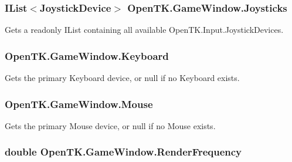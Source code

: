 \hypertarget{class_open_t_k_1_1_game_window_a97fe86dfe28cd8c059e53dc22a20458a}{
\subsubsection[{Joysticks}]{\setlength{\rightskip}{0pt plus 5cm}I\-List$<${\bf Joystick\-Device}$>$ Open\-T\-K.\-Game\-Window.\-Joysticks\hspace{0.3cm}{\ttfamily [get]}}}\label{class_open_t_k_1_1_game_window_a97fe86dfe28cd8c059e53dc22a20458a}


Gets a readonly I\-List containing all available Open\-T\-K.\-Input.\-Joystick\-Devices. 

\hypertarget{class_open_t_k_1_1_game_window_a1d5ef67f9be67c7355cacbde9872e09e}{
\subsubsection[{Keyboard}]{ Open\-T\-K.\-Game\-Window.\-Keyboard\hspace{0.3cm}{\ttfamily [get]}}}\label{class_open_t_k_1_1_game_window_a1d5ef67f9be67c7355cacbde9872e09e}


Gets the primary Keyboard device, or null if no Keyboard exists. 

\hypertarget{class_open_t_k_1_1_game_window_acdb499cde709b6a6b8630613954094f9}{
\subsubsection[{Mouse}]{ Open\-T\-K.\-Game\-Window.\-Mouse\hspace{0.3cm}{\ttfamily [get]}}}\label{class_open_t_k_1_1_game_window_acdb499cde709b6a6b8630613954094f9}


Gets the primary Mouse device, or null if no Mouse exists. 

\hypertarget{class_open_t_k_1_1_game_window_a6657b7cd7da85b770580c840a197f30b}{
\subsubsection[{Render\-Frequency}]{\setlength{\rightskip}{0pt plus 5cm}double Open\-T\-K.\-Game\-Window.\-Render\-Frequency\hspace{0.3cm}{\ttfamily [get]}}}\label{class_open_t_k_1_1_game_window_a6657b7cd7da85b770580c840a197f30b}


